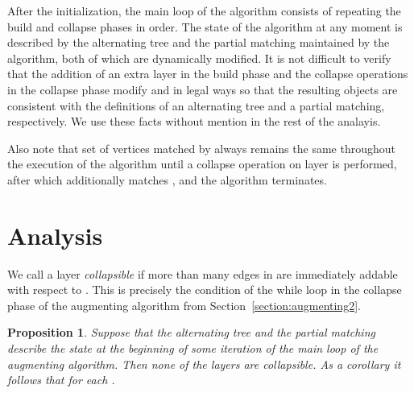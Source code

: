 \documentclass[11pt]{article}
\newtheorem{proposition}[theorem]{Proposition}
\theoremstyle{definition}
\theoremstyle{remark}
\begin{document}
After the initialization, the main loop of the algorithm consists of
repeating the build and collapse phases in order. The state of the
algorithm at any moment is described by the alternating tree
 and the partial matching  maintained by the
algorithm, both of which are dynamically modified. It is not difficult
to verify that the addition of an extra layer  in the
build phase and the collapse operations in the collapse phase modify
 and  in legal ways so that the resulting objects are consistent
with the definitions of an alternating tree and a partial matching,
respectively. We use these
facts without mention in the rest of the analayis.

Also note that set of vertices matched by  always remains the same
throughout the execution of the algorithm until a collapse operation
on layer  is performed, after which  additionally matches
, and the algorithm terminates.

 


\section{Analysis}\label{section:analysis}
We call a layer  \emph{collapsible} if more than  many edges in  are immediately addable with respect to . This is precisely the condition of the while loop in the collapse phase of the augmenting algorithm from Section~\ref{section:augmenting2}.



\begin{proposition}\label{lem:notcollapsible}
  Suppose that the alternating tree  and the
  partial matching  describe the state at the beginning of some
  iteration of the main loop of the augmenting algorithm. Then none of
  the layers  are collapsible. As a corollary it
  follows that  for each .
\end{proposition}
\end{document}
